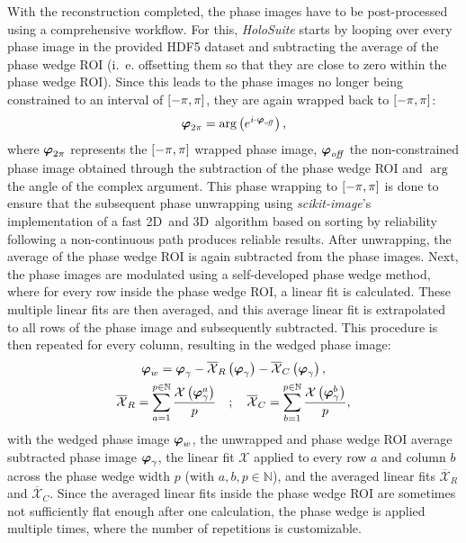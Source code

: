With the reconstruction completed, the phase images have to be post-processed using a comprehensive workflow. For this, \emph{HoloSuite} starts by looping over every phase image in the provided HDF5 dataset and subtracting the average of the phase wedge ROI (i.\, e. offsetting them so that they are close to zero within the phase wedge ROI). Since this leads to the phase images no longer being constrained to an interval of $\interval{-\pi}{\pi}$, they are again wrapped back to $\interval{-\pi}{\pi}$:
\begin{equation}
\vb*{\varphi}_{2\pi} = \arg\left(e^{i \cdot \vb*{\varphi}_{\mathit{off}}}\right),
\end{equation}
where $\vb*{\varphi}_{2\pi}$ represents the $\interval{-\pi}{\pi}$ wrapped phase image, $\vb*{\varphi}_{\mathit{off}}$ the non-constrained phase image obtained through the subtraction of the phase wedge ROI and $\arg$ the angle of the complex argument. This phase wrapping to $\interval{-\pi}{\pi}$ is done to ensure that the subsequent phase unwrapping using \emph{scikit-image}'s implementation \cite{Vanderwalt2014} of a fast 2D~and 3D~algorithm based on sorting by reliability following a non-continuous path \cite{Herraez2002,AbdulRahman2005} produces reliable results. After unwrapping, the average of the phase wedge ROI is again subtracted from the phase images. Next, the phase images are modulated using a self-developed phase wedge method, where for every row inside the phase wedge ROI, a linear fit is calculated. These multiple linear fits are then averaged, and this average linear fit is extrapolated to all rows of the phase image and subsequently subtracted. This procedure is then repeated for every column, resulting in the wedged phase image:
\begin{gather}
\vb*{\varphi}_w = \vb*{\varphi}_{\gamma} - \overline{\mathcal{X}}_R\left(\vb*{\varphi}_{\gamma}\right) - \overline{\mathcal{X}}_C\left(\vb*{\varphi}_{\gamma}\right), \label{eq:holosuite-phase-wedge} \\
\overline{\mathcal{X}}_R = \sum\limits_{a=1}^{p \in \mathbb{N}} \frac{\mathcal{X}\left(\vb*{\varphi}_{\gamma}^a\right)}{p} \quad ; \quad \overline{\mathcal{X}}_C = \sum\limits_{b=1}^{p \in \mathbb{N}} \frac{\mathcal{X}\left(\vb*{\varphi}_{\gamma}^b\right)}{p}, \label{eq:holosuite-phase-wedge-average-fit}
\end{gather}
with the wedged phase image $\vb*{\varphi}_w$, the unwrapped and phase wedge ROI average subtracted phase image $\vb*{\varphi}_{\gamma}$, the linear fit $\mathcal{X}$ applied to every row $a$ and column $b$ across the phase wedge width $p$ (with $a, b, p \in \mathbb{N}$), and the averaged linear fits $\overline{\mathcal{X}}_R$ and $\overline{\mathcal{X}}_C$. Since the averaged linear fits inside the phase wedge ROI are sometimes not sufficiently flat enough after one calculation, the phase wedge is applied multiple times, where the number of repetitions is customizable.

